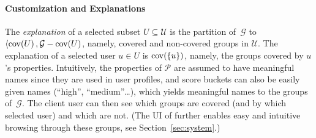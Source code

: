 






\paragraph*{Customization and Explanations}
The \emph{explanation} of a selected subset $U\subseteq\mathcal{U}$ is the partition of~$\mathcal{G}$ to $\langle \operatorname{cov}\!\left({U}\right), \mathcal{G}-\operatorname{cov}\!\left({U}\right)$, namely, covered and non-covered groups in $\mathcal{U}$. The explanation of a selected user $u\in U$ is $\operatorname{cov}\!\left({\{u\}}\right)$, namely, the groups covered by $u$'s properties. Intuitively, the properties of $\mathcal{P}$ are assumed to have meaningful names since they are used in user profiles, and score buckets can also be easily given names (``high'', ``medium''\dots), which yields meaningful names to  the groups of~$\mathcal{G}$. The client user can then see which groups are covered (and by which selected user) and which are not. (The UI of \sysname{} further enables easy and intuitive browsing through these groups, see Section~\ref{sec:system}.)

